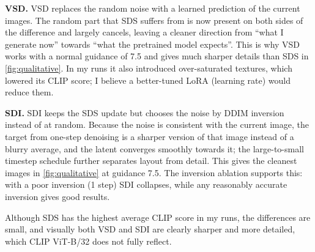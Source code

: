 \noindent\textbf{VSD.}
VSD replaces the random noise with a learned prediction of the current images.
The random part that SDS suffers from is now present on both sides of the difference and largely cancels, leaving a cleaner direction from ``what I generate now'' towards ``what the pretrained model expects''.
This is why VSD works with a normal guidance of 7.5 and gives much sharper details than SDS in \cref{fig:qualitative}.
In my runs it also introduced over-saturated textures, which lowered its CLIP score; I believe a better-tuned LoRA (\eg learning rate) would reduce them.

\noindent\textbf{SDI.}
SDI keeps the SDS update but chooses the noise by DDIM inversion instead of at random.
Because the noise is consistent with the current image, the target from one-step denoising is a sharper version of that image instead of a blurry average, and the latent converges smoothly towards it; the large-to-small timestep schedule further separates layout from detail.
This gives the cleanest images in \cref{fig:qualitative} at guidance 7.5.
The inversion ablation supports this: with a poor inversion (1 step) SDI collapses, while any reasonably accurate inversion gives good results.

Although SDS has the highest average CLIP score in my runs, the differences are small, and visually both VSD and SDI are clearly sharper and more detailed, which CLIP ViT-B/32 does not fully reflect.
